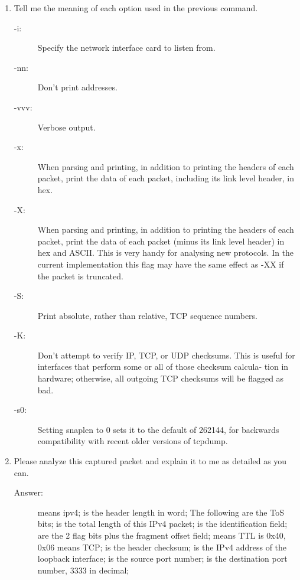 \documentclass{swfulabreport}
\begin{document}
\begin{enumerate}
\item Tell me the meaning of each option used in the previous command.
  \begin{description}
  \item[-i:] Specify the network interface card to listen from.
  \item[-nn:] Don't print addresses.
  \item[-vvv:] Verbose output.
  \item[-x:] When parsing and printing, in addition to printing the
    headers of each packet, print the data of each packet, including
    its link level header, in hex.
  \item[-X:] When parsing and printing, in addition to printing the
    headers of each packet, print the data of each packet (minus its
    link level header) in hex and ASCII.  This is very handy for
    analysing new protocols.  In the current implementation this flag
    may have the same effect as -XX if the packet is truncated.
  \item[-S:] Print absolute, rather than relative, TCP sequence
    numbers.
  \item[-K:] Don't attempt to verify IP, TCP, or UDP checksums.  This
    is useful for interfaces that perform some or all of those
    checksum calcula‐ tion in hardware; otherwise, all outgoing TCP
    checksums will be flagged as bad.
  \item[-s0:] Setting snaplen to 0 sets it to the default of 262144,
    for backwards compatibility with recent older versions of tcpdump.
  \end{description}
  
\item Please analyze this captured packet and explain it to me as
  detailed as you can.
  \begin{description}
  \item[Answer:] means ipv4; is the header length in
    word; The  following  are the ToS bits;
     is the total length of this IPv4 packet; 
    is the identification field;  are the 2 flag bits plus
    the fragment offset field;  means TTL is 0x40, 0x06
    means TCP;  is the header checksum;  is
    the IPv4 address of the loopback interface;  is the
    source port number;  is the destination port number,
    3333 in decimal; 
  \end{description}
\end{enumerate}
\end{document}
